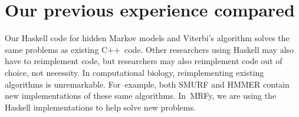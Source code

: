 \documentclass[preprint,nonatbib,blockstyle,times]{sigplanconf}
\newcommand\seclabel[1]{\label{sec:#1}}
\begin{document}


 
 
\section{Our previous experience compared}
\seclabel{comparo}

Our Haskell code for hidden Markov models and Viterbi's algorithm
solves the same problems as existing C++~code.
Other researchers using Haskell may also have to reimplement code,
but researchers may also reimplement code out of choice, not
necessity.
In computational biology, reimplementing existing algorithms is unremarkable.
For~example, both SMURF and HMMER contain new implementations of these
same algorithms.
In~MRFy, we are using the Haskell implementations to help solve new
problems. 
\end{document}
